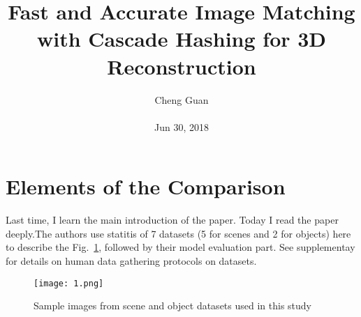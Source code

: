 \documentclass[10pt,twocolumn,letterpaper]{article}
\title{Fast and Accurate Image Matching with Cascade Hashing for 3D Reconstruction}
\author{Cheng Guan\\\\
Jun 30, 2018}
\begin{document}
\maketitle
\section{Elements of the Comparison}
Last time, I learn the main introduction of the paper. Today I read the paper deeply.The authors use statitis of 7 datasets (5 for scenes and 2 for objects) here to describe  the Fig.~\ref{fig1}, followed by their model evaluation part. See supplementay for details on human data gathering protocols on datasets.
\begin{figure}[htbp]
  \centering
  \texttt{[image: 1.png]}\\
  \caption{Sample images from scene and object datasets used in this study}
  \label{fig1}
\end{figure}
\end{document}
